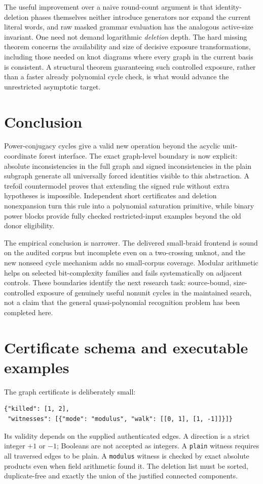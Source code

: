 \documentclass[11pt]{article}
\theoremstyle{definition}\newtheorem{definition}[theorem]{Definition}
\theoremstyle{remark}\newtheorem{remark}[theorem]{Remark}
\newcommand{\code}[1]{\texttt{#1}}
\begin{document}
The useful improvement over a naive round-count argument is that
identity-deletion phases themselves neither introduce generators nor
expand the current literal words, and raw masked grammar evaluation has
the analogous active-size invariant. One need not demand logarithmic
\emph{deletion} depth. The hard missing theorem concerns the availability
and size of decisive exposure transformations, including those needed
on knot diagrams where every graph in the current basis is consistent.
A structural theorem guaranteeing such controlled exposure, rather than
a faster already polynomial cycle check, is what would advance the
unrestricted asymptotic target.

\section{Conclusion}
Power-conjugacy cycles give a valid new operation beyond the acyclic
unit-coordinate forest interface. The exact graph-level boundary is now
explicit: absolute inconsistencies in the full graph and signed
inconsistencies in the plain subgraph generate all universally forced
identities visible to this abstraction. A trefoil countermodel proves
that extending the signed rule without extra hypotheses is impossible.
Independent short certificates and deletion nonexpansion turn this rule
into a polynomial saturation primitive, while binary power blocks provide
fully checked restricted-input examples beyond the old donor eligibility.

The empirical conclusion is narrower. The delivered small-braid frontend
is sound on the audited corpus but incomplete even on a two-crossing
unknot, and the new nonseed cycle mechanism adds no small-corpus coverage.
Modular arithmetic helps on selected bit-complexity families and fails
systematically on adjacent controls. These boundaries identify the next
research task: source-bound, size-controlled exposure of genuinely useful
nonunit cycles in the maintained search, not a claim that the general
quasi-polynomial recognition problem has been completed here.

\appendix
\section{Certificate schema and executable examples}
The graph certificate is deliberately small:
\begin{lstlisting}
{"killed": [1, 2],
 "witnesses": [{"mode": "modulus", "walk": [[0, 1], [1, -1]]}]}
\end{lstlisting}
Its validity depends on the supplied authenticated edges. A direction is
a strict integer $+1$ or $-1$; Booleans are not accepted as integers. A
\code{plain} witness requires all traversed edges to be plain. A
\code{modulus} witness is checked by exact absolute products even when
field arithmetic found it. The deletion list must be sorted, duplicate-free
and exactly the union of the justified connected components.
\end{document}

